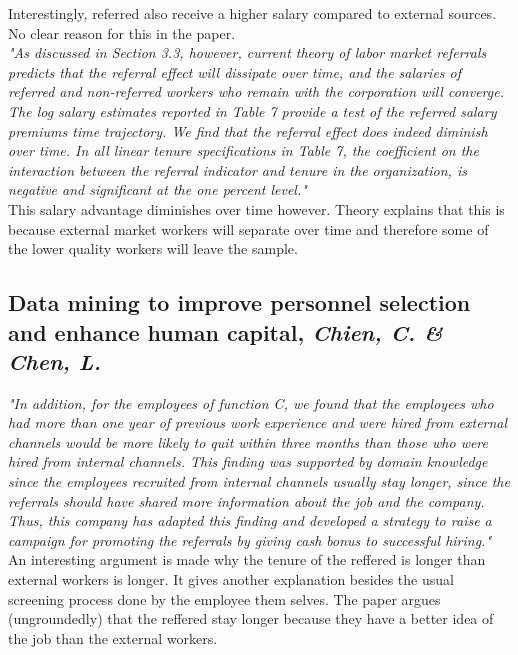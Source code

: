 \documentclass[a4paper, 11pt]{article} %
\begin{document}
Interestingly, referred also receive a higher salary compared to external sources. No clear reason for this in the paper.\\

\emph{"As discussed in Section 3.3, however, current theory of labor market referrals predicts that the
referral effect will dissipate over time, and the salaries of referred and non-referred workers who
remain with the corporation will converge. The log salary estimates reported in Table 7 provide a
test of the referred salary premiums time trajectory.
We find that the referral effect does indeed diminish over time. In all linear tenure specifications
in Table 7, the coefficient on the interaction between the referral indicator and tenure in the
organization, is negative and significant at the one percent level."}\\

This salary advantage diminishes over time however. Theory explains that this is because external market workers will separate over
time and therefore some of the lower quality workers will leave the sample.

\subsection*{Data mining to improve personnel selection and enhance human capital, \emph{Chien, C. \& Chen, L.} \cite{sixth}}

\emph{"In addition, for
the employees of function C, we found that the
employees who had more than one year of previous
work experience and were hired from external channels
would be more likely to quit within three months than those who were hired from internal channels. This finding was supported by domain knowledge
since the employees recruited from internal channels
usually stay longer, since the referrals should have
shared more information about the job and the company.
Thus, this company has adapted this finding
and developed a strategy to raise a campaign for promoting
the referrals by giving cash bonus to successful
hiring."} \\

An interesting argument is made why the tenure of the reffered is longer than external workers is longer. It gives another explanation besides
the usual screening process done by the employee them selves. The paper argues (ungroundedly) that the reffered stay longer because they have
a better idea of the job than the external workers. 
\end{document}
